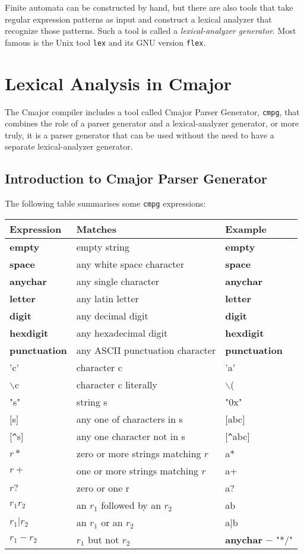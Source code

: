 \documentclass[a4paper,oneside,11pt]{book}
\theoremstyle{definition}
\begin{document}
Finite automata can be constructed by hand, but there are also tools that take regular expression patterns as input and construct a
lexical analyzer that recognize those patterns. Such a tool is called a \emph{lexical-analyzer generator}.
Most famous is the Unix tool \verb|lex| and its GNU version \verb|flex|.

\clearpage
\section{Lexical Analysis in Cmajor}

The Cmajor compiler includes a tool called Cmajor Parser Generator, \verb|cmpg|, that combines the role of a parser generator and
a lexical-analyzer generator, or more truly, it is a parser generator that can be used without the need to have a separate
lexical-analyzer generator.

\subsection{Introduction to Cmajor Parser Generator}

The following table summarises some \verb|cmpg| expressions:

\begin{flushleft}
\begin{tabular}{lll}
\textbf{Expression}& \textbf{Matches}& \textbf{Example}\\
\hline
\textbf{empty}& empty string& \textbf{empty}\\
\textbf{space}& any white space character& \textbf{space}\\
\textbf{anychar}& any single character& \textbf{anychar}\\
\textbf{letter}& any latin letter& \textbf{letter}\\
\textbf{digit}& any decimal digit& \textbf{digit}\\
\textbf{hexdigit}& any hexadecimal digit& \textbf{hexdigit}\\
\textbf{punctuation}& any ASCII punctuation character& \textbf{punctuation}\\
'c'& character c& 'a'\\
$\backslash$c& character c literally& $\backslash$(\\
"s"& string s& "0x"\\
$[$s$]$& any one of characters in s& $[$abc$]$\\
$[$\verb|^|s$]$& any one character not in s& $[$\verb|^|abc$]$\\
$r*$& zero or more strings matching $r$& a*\\
$r+$& one or more strings matching $r$& a+\\
$r?$& zero or one r& a?\\
$r_1r_2$& an $r_1$ followed by an $r_2$& ab\\
$r_1 | r_2$& an $r_1$ or an $r_2$& a$|$b\\
$r_1 - r_2$& $r_1$ but not $r_2$& \textbf{anychar} $-$ "*/"\\
\hline
\end{tabular}
\end{flushleft}
\end{document}
